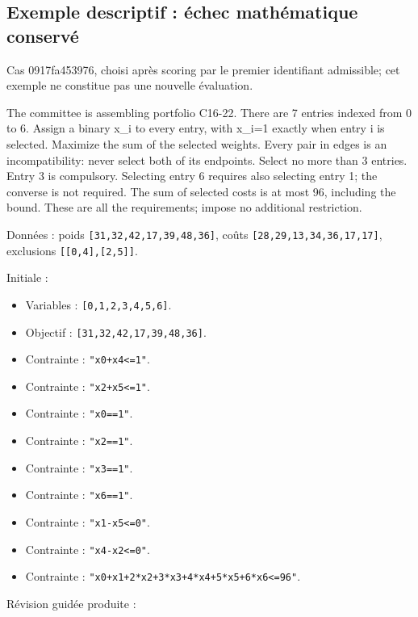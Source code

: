 \documentclass[11pt]{article}
\begin{document}
\subsection{Exemple descriptif : échec mathématique conservé}

Cas 0917fa453976, choisi après scoring par le premier identifiant admissible; cet exemple ne constitue pas une nouvelle évaluation.

The committee is assembling portfolio C16-22. There are 7 entries indexed from 0 to 6. Assign a binary x\_i to every entry, with x\_i=1 exactly when entry i is selected. Maximize the sum of the selected weights. Every pair in edges is an incompatibility: never select both of its endpoints. Select no more than 3 entries. Entry 3 is compulsory. Selecting entry 6 requires also selecting entry 1; the converse is not required. The sum of selected costs is at most 96, including the bound. These are all the requirements; impose no additional restriction.

Données : poids \texttt{[31,32,42,17,39,48,36]}, coûts \texttt{[28,29,13,34,36,17,17]}, exclusions \texttt{[[0,4],[2,5]]}.

Initiale :

\begin{itemize}
\item Variables : \texttt{[0,1,2,3,4,5,6]}.
\item Objectif : \texttt{[31,32,42,17,39,48,36]}.
\item Contrainte : \texttt{"x0+x4<=1"}.
\item Contrainte : \texttt{"x2+x5<=1"}.
\item Contrainte : \texttt{"x0==1"}.
\item Contrainte : \texttt{"x2==1"}.
\item Contrainte : \texttt{"x3==1"}.
\item Contrainte : \texttt{"x6==1"}.
\item Contrainte : \texttt{"x1-x5<=0"}.
\item Contrainte : \texttt{"x4-x2<=0"}.
\item Contrainte : \texttt{"x0+x1+2*x2+3*x3+4*x4+5*x5+6*x6<=96"}.
\end{itemize}

Révision guidée produite :
\end{document}
